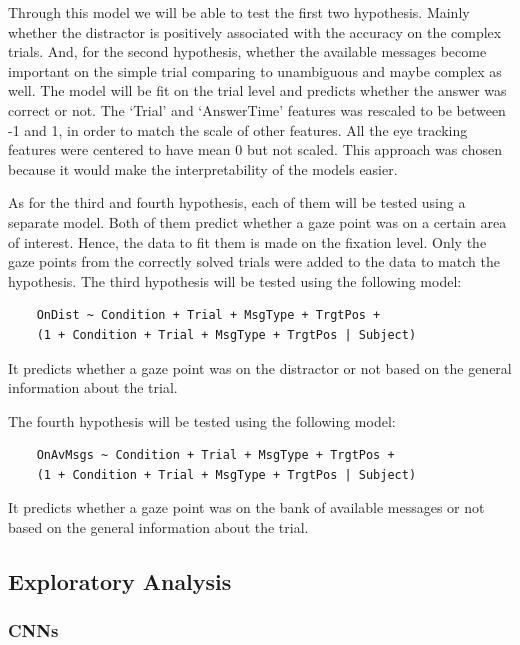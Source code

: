 Through this model we will be able to test the first two hypothesis. Mainly whether the distractor is positively associated with the accuracy on the complex trials. And, for the second hypothesis, whether the available messages become important on the simple trial comparing to unambiguous and maybe complex as well. The model will be fit on the trial level and predicts whether the answer was correct or not. The `Trial' and `AnswerTime' features was rescaled to be between -1 and 1, in order to match the scale of other features. All the eye tracking features were centered to have mean 0 but not scaled. This approach was chosen because it would make the interpretability of the models easier.

As for the third and fourth hypothesis, each of them will be tested using a separate model. Both of them predict whether a gaze point was on a certain area of interest. Hence, the data to fit them is made on the fixation level. Only the gaze points from the correctly solved trials were added to the data to match the hypothesis. The third hypothesis will be tested using the following model:
\begin{verbatim}
    OnDist ~ Condition + Trial + MsgType + TrgtPos +
    (1 + Condition + Trial + MsgType + TrgtPos | Subject)
\end{verbatim}
It predicts whether a gaze point was on the distractor or not based on the general information about the trial. 

The fourth hypothesis will be tested using the following model:
\begin{verbatim}
    OnAvMsgs ~ Condition + Trial + MsgType + TrgtPos +
    (1 + Condition + Trial + MsgType + TrgtPos | Subject)
\end{verbatim}
It predicts whether a gaze point was on the bank of available messages or not based on the general information about the trial. 

\subsection{Exploratory Analysis}
\label{sec:analysis:exploratory}

\subsubsection{CNNs}
\label{sec:analysis:exploratory:cnn}
